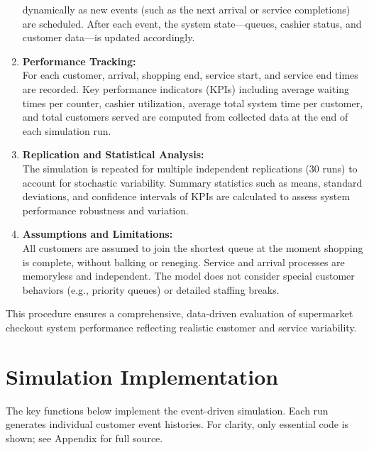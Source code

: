 \documentclass[
]{article}
\begin{document}
\begin{enumerate}
  dynamically as new events (such as the next arrival or service
  completions) are scheduled. After each event, the system
  state---queues, cashier status, and customer data---is updated
  accordingly.
\item
  \textbf{Performance Tracking:}\\
  For each customer, arrival, shopping end, service start, and service
  end times are recorded. Key performance indicators (KPIs) including
  average waiting times per counter, cashier utilization, average total
  system time per customer, and total customers served are computed from
  collected data at the end of each simulation run.
\item
  \textbf{Replication and Statistical Analysis:}\\
  The simulation is repeated for multiple independent replications (30
  runs) to account for stochastic variability. Summary statistics such
  as means, standard deviations, and confidence intervals of KPIs are
  calculated to assess system performance robustness and variation.
\item
  \textbf{Assumptions and Limitations:}\\
  All customers are assumed to join the shortest queue at the moment
  shopping is complete, without balking or reneging. Service and arrival
  processes are memoryless and independent. The model does not consider
  special customer behaviors (e.g., priority queues) or detailed
  staffing breaks.
\end{enumerate}

This procedure ensures a comprehensive, data-driven evaluation of
supermarket checkout system performance reflecting realistic customer
and service variability.

\newpage
\centering

\section{Simulation Implementation}\label{simulation-implementation}

\justifying

The key functions below implement the event-driven simulation. Each run
generates individual customer event histories. For clarity, only
essential code is shown; see Appendix for full source.
\end{document}
